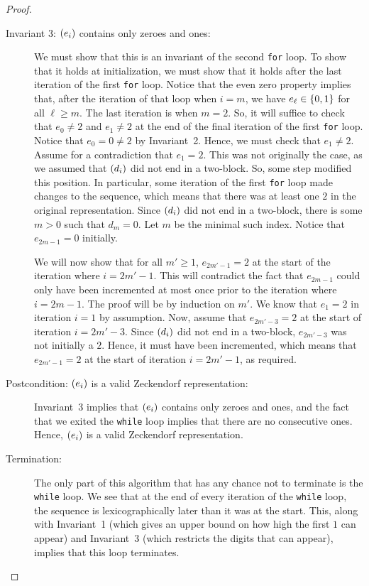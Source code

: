 \documentclass[english,12pt]{article}
\newcommand{\seq}{\p}
\begin{document}
\begin{proof}
\begin{description}
\item[Invariant 3: $\seq{e_i}$ contains only zeroes and ones:] We must show that this is an invariant of the second \texttt{for} loop.  To show that it holds at initialization, we must show that it holds after the last iteration of the first \texttt{for} loop.  Notice that the even zero property implies that, after the iteration of that loop when $i=m$, we have $e_\ell\in\left\{0,1\right\}$ for all $\ell\geq m$.  The last iteration is when $m=2$.  So, it will suffice to check that $e_0\neq2$ and $e_1\neq2$ at the end of the final iteration of the first \texttt{for} loop.  Notice that $e_0=0\neq2$ by Invariant~2.  Hence, we must check that $e_1\neq2$.  Assume for a contradiction that $e_1=2$.  This was not originally the case, as we assumed that $\seq{d_i}$ did not end in a two-block.  So, some step modified this position.  In particular, some iteration of the first \texttt{for} loop made changes to the sequence, which means that there was at least one $2$ in the original representation.  Since $\seq{d_i}$ did not end in a two-block, there is some $m>0$ such that $d_m=0$.  Let $m$ be the minimal such index.  Notice that $e_{2m-1}=0$ initially.

We will now show that for all $m'\geq1$, $e_{2m'-1}=2$ at the start of the iteration where $i=2m'-1$.  This will contradict the fact that $e_{2m-1}$ could only have been incremented at most once prior to the iteration where $i=2m-1$.  The proof will be by induction on $m'$.  We know that $e_1=2$ in iteration $i=1$ by assumption.  Now, assume that $e_{2m'-3}=2$ at the start of iteration $i=2m'-3$.  Since $\seq{d_i}$ did not end in a two-block, $e_{2m'-3}$ was not initially a $2$.  Hence, it must have been incremented, which means that $e_{2m'-1}=2$ at the start of iteration $i=2m'-1$, as required.
\item[Postcondition: $\seq{e_i}$ is a valid Zeckendorf representation:] Invariant~3 implies that $\seq{e_i}$ contains only zeroes and ones, and the fact that we exited the \texttt{while} loop implies that there are no consecutive ones.  Hence, $\seq{e_i}$ is a valid Zeckendorf representation.
\item[Termination:] The only part of this algorithm that has any chance not to terminate is the \texttt{while} loop.  We see that at the end of every iteration of the \texttt{while} loop, the sequence is lexicographically later than it was at the start.  This, along with Invariant~1 (which gives an upper bound on how high the first $1$ can appear) and Invariant~3 (which restricts the digits that can appear), implies that this loop terminates.
\end{description}


\end{proof}
\end{document}
